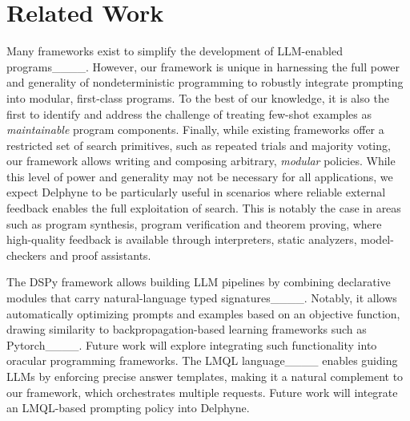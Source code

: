 \section{Related Work}
\label{sec:related-work}

Many frameworks exist to simplify the development of LLM-enabled programs____. However, our framework is unique in harnessing the full power and generality of nondeterministic programming to robustly integrate prompting into modular, first-class programs. To the best of our knowledge, it is also the first to identify and address the challenge of treating few-shot examples as \emph{maintainable} program components. Finally, while existing frameworks offer a restricted set of search primitives, such as repeated trials and majority voting, our framework allows writing and composing arbitrary, \emph{modular} policies. While this level of power and generality may not be necessary for all applications, we expect Delphyne to be particularly useful in scenarios where reliable external feedback enables the full exploitation of search. This is notably the case in areas such as program synthesis, program verification and theorem proving, where high-quality feedback is available through interpreters, static analyzers, model-checkers and proof assistants.

The DSPy framework allows building LLM pipelines by combining declarative modules that carry natural-language typed signatures____. Notably, it allows automatically optimizing prompts and examples based on an objective function, drawing similarity to backpropagation-based learning frameworks such as Pytorch____. Future work will explore integrating such functionality into oracular programming frameworks. The LMQL language____ enables guiding LLMs by enforcing precise answer templates, making it a natural complement to our framework, which orchestrates multiple requests. Future work will integrate an LMQL-based prompting policy into Delphyne.